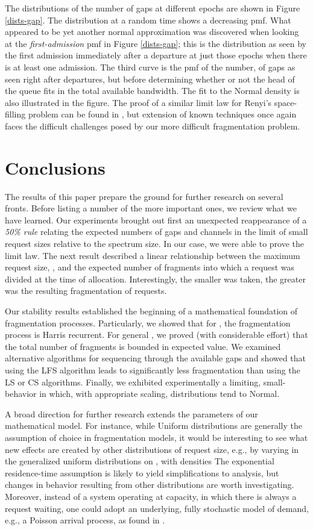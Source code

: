 \documentclass{amsart}
\begin{document}
The distributions of the number of gaps at different epochs are shown
in Figure \ref{dists-gap}.  The distribution at a random time shows
a decreasing pmf. What appeared to be
yet another normal approximation was discovered when looking at the
{\em first-admission} pmf in Figure \ref{dists-gap};  this is the
distribution as seen by the first admission immediately after a
departure at just those epochs when there is at least one admission.
The third curve is the pmf of the number,  of gaps as seen
right after departures, but before determining whether or not the
head of the queue fits in the total available bandwidth. The fit to
the Normal density is also illustrated in the figure. The
proof of a similar limit law for Renyi's space-filling problem can
be found in \cite{DRlongago}, but extension of known techniques once
again faces the difficult challenges posed by our more difficult
fragmentation problem.

\section{Conclusions}\label{sec:conc}
The results of this paper prepare the ground for further research on
several fronts.  Before listing a number of the more important ones,
we review what we have learned.  Our experiments brought out first
an unexpected reappearance of a {\em 50\% rule} relating the
expected numbers of gaps and channels in the limit of small request
sizes relative to the spectrum size.  In our case, we were able to
prove the limit law.   The next result described a linear
relationship between the maximum request size, , and the
expected number of fragments into which a request was divided at the
time  of allocation. Interestingly, the smaller  was taken,
the greater was the resulting fragmentation of requests.

Our stability
results  established the beginning of a mathematical
foundation of fragmentation processes. Particularly, we showed
that for , the fragmentation process is Harris
recurrent. For general , we proved (with considerable
effort) that the total number of fragments is bounded in expected
value.  We examined alternative algorithms for sequencing through the available gaps and showed that using the LFS algorithm leads to significantly less fragmentation than using the LS or CS algorithms. Finally, we exhibited experimentally a limiting,
small- behavior in which, with appropriate scaling,
distributions tend to Normal.

A broad direction for further research extends the parameters of our
mathematical model.  For instance, while Uniform distributions are
generally the assumption of choice in fragmentation models, it would
be interesting to see what new effects are created by other
distributions of request size, e.g., by varying  in the
generalized uniform distributions on , with densities
  The exponential residence-time assumption is
likely to yield simplifications to analysis,  but changes
in behavior resulting from other distributions are worth
investigating. Moreover, instead of a system operating at capacity, in which there
is always a request waiting, one could
adopt an underlying, fully stochastic model of demand, e.g., a
Poisson arrival process, as found in \cite{KipnisR1990}.
\end{document}
